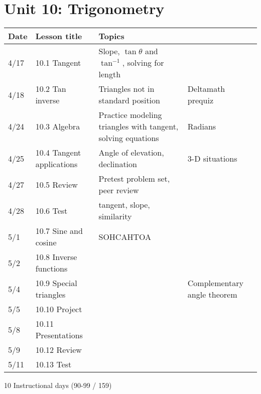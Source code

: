 \documentclass[12pt, twoside]{article}
\begin{document}
\section*{Unit 10: Trigonometry}
\begin{tabular}{|p{0.9cm}|p{4cm}|p{7cm}|p{5cm}|}
  \hline
  Date & Lesson title & Topics  &  \\
  \hline
  4/17 & 10.1 Tangent & Slope, $\tan \theta$ and $\tan^{-1}$, solving for length &  \\
  \hline
  4/18 & 10.2 Tan inverse & Triangles not in standard position & Deltamath prequiz \\
  \hline
  4/24 & 10.3 Algebra & Practice modeling triangles with tangent, solving equations & Radians \\
  \hline
  4/25 & 10.4 Tangent applications & Angle of elevation, declination & 3-D situations \\
  \hline
  4/27 & 10.5 Review & Pretest problem set, peer review &  \\
  \hline
  4/28 & 10.6 Test & tangent, slope, similarity &  \\
  \hline
  5/1 & 10.7 Sine and cosine & SOHCAHTOA &  \\
  \hline
  5/2 & 10.8 Inverse functions &  &  \\
  \hline
  5/4 & 10.9 Special triangles &  & Complementary angle theorem \\
  \hline
  5/5 & 10.10 Project &  &  \\
  \hline
  5/8 & 10.11 Presentations &  &  \\
  \hline
  5/9 & 10.12 Review &  &  \\
  \hline
  5/11 & 10.13 Test &  &  \\
  \hline

\end{tabular} \par \vspace*{0.3cm}
10 Instructional days (90-99 / 159)
\end{document}
